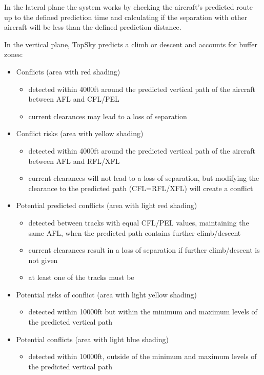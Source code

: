 \documentclass[a4paper,oneside,11pt]{memoir}
\begin{document}
\bigskip

In the lateral plane the system works by checking the aircraft’s predicted route up to the defined prediction time and calculating if the separation with other aircraft will be less than the defined prediction distance.

\bigskip

In the vertical plane, TopSky predicts a climb or descent and accounts for buffer zones:


\begin{itemize}
    \item Conflicts (area with red shading)
    \begin{itemize}
        \item detected within 4000ft around the predicted vertical path of the aircraft between AFL and CFL/PEL
        \item current clearances may lead to a loss of separation
    \end{itemize}
    \item Conflict risks (area with yellow shading)
    \begin{itemize}
        \item detected within 4000ft around the predicted vertical path of the aircraft between AFL and RFL/XFL
        \item current clearances will not lead to a loss of separation, but modifying the clearance to the predicted path (CFL=RFL/XFL) will create a conflict
    \end{itemize}
    \item Potential predicted conflicts (area with light red shading)
    \begin{itemize}
        \item detected between tracks with equal CFL/PEL values, maintaining the same AFL, when the predicted path contains further climb/descent
        \item current clearances result in a loss of separation if further climb/descent is not given
        \item at least one of the tracks must be 
    \end{itemize}
    \item Potential risks of conflict (area with light yellow shading)
    \begin{itemize}
        \item detected within 10000ft but within the minimum and maximum levels of the predicted vertical path
    \end{itemize}
    \item Potential conflicts (area with light blue shading)
    \begin{itemize}
        \item detected within 10000ft, outside of the minimum and maximum levels of the predicted vertical path
    \end{itemize}
\end{itemize}
\end{document}
